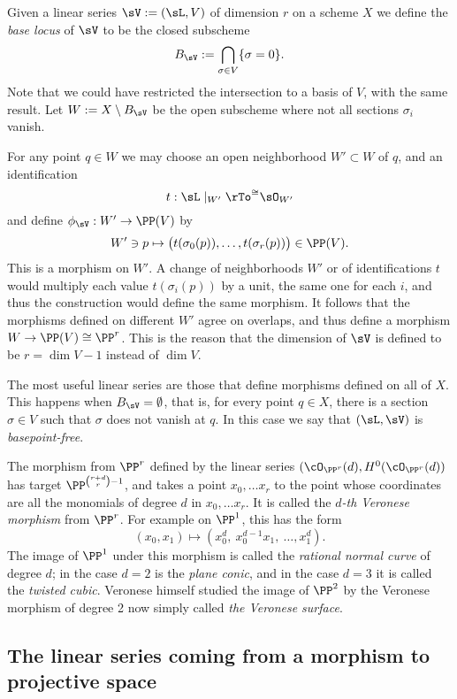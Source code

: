 Given a linear series $\sV:=(\sL, V)$  of dimension $r$ on a scheme $X$
we define the \emph{base locus} of $\sV$ to be the closed subscheme 
$$
B_\sV := \bigcap_{\sigma\in V}\{\sigma = 0\}.
$$
Note that we could have restricted the intersection to a basis of $V$, with the same result.
Let $W:=X\setminus B_\sV$ be the open subscheme where not all sections $\sigma_{i}$ vanish.

For any point $q\in W$ we  may choose an open neighborhood $W'\subset W$ of $q$, and an identification 
$$
t: \sL\mid_{W'} \rTo^{\cong} \sO_{W'}
$$
and define $\phi_{\sV}: W' \to \PP(V)$ by 
$$
W'\ni p \mapsto \bigl(t(\sigma_{0}(p)),\dots, t(\sigma_{r}(p))\bigr) \in \PP(V).
$$
This  is a morphism on $W'$. A change of neighborhoods $W'$ or of identifications $t$ would multiply
each value $t(\sigma_{i}(p))$ by a unit, the same one for each $i$, and thus the construction would define the same morphism. It follows that the morphisms
defined on different $W'$ agree on overlaps, and thus define a morphism $W \to \PP(V) \cong \PP^r$. This is the reason
that the dimension of $\sV$ is defined to be $r=\dim V -1$ instead of $\dim V$.

The most useful linear series are those that define morphisms defined on all of $X$. This happens when $B_\sV = \emptyset$,
that is, for every point $q\in X$, there is a section $\sigma \in V$ such that $\sigma$ does not vanish at $q$. In this case we say that $(\sL, \sV)$ is \emph{basepoint-free}.

\begin{example}\label{Veronese definition}
The morphism from $\PP^r$ defined by the  linear series $(\cO_{\PP^r}(d), H^0(\cO_{\PP^r}(d))$ has target
$\PP^{{r+d\choose r}-1}$, and takes a point $x_0,\dots x_r$ to the point whose coordinates are all the monomials of
degree $d$ in $x_0,\dots x_r$. It is called the \emph{$d$-th Veronese morphism} from $\PP^r$. For example on $\PP^1$, this has the form
$$
(x_0,x_1) \mapsto (x_0^d,\ x_0^{d-1}x_1,\ \dots,x_1^d).
$$
The image of $\PP^1$ under this morphism is called the \emph{rational normal curve} of degree $d$; in the case $d=2$ is the
\emph{plane conic}, and in the case $d=3$ it is called the \emph{twisted cubic}. Veronese himself studied the image of $\PP^2$
by the Veronese morphism of degree 2 now simply called \emph{the Veronese surface}.
\end{example}


\subsection{The linear series coming from a morphism to projective space}\label{series from morphism}

